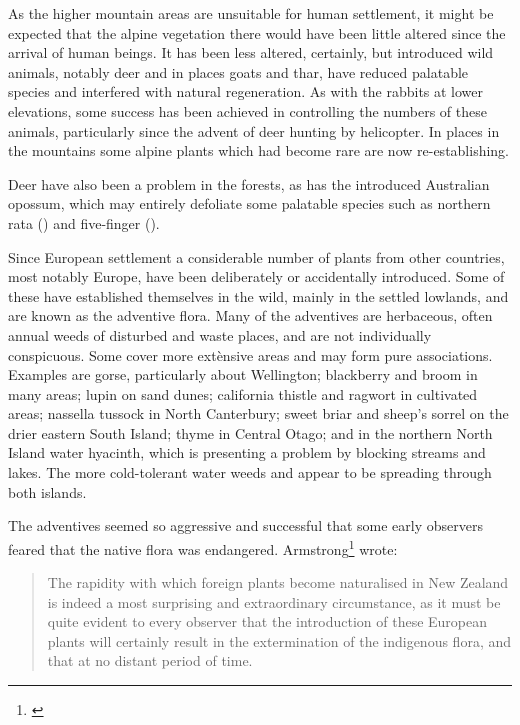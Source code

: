 As the higher mountain areas are unsuitable for human settlement, it might be expected that the alpine vegetation there would have been little altered since the arrival of human beings.
It has been less altered, certainly, but introduced wild animals, notably deer and in places goats and thar, have reduced palatable species and interfered with natural regeneration.
As with the rabbits at lower elevations, some success has been achieved in controlling the numbers of these animals, particularly since the advent of deer hunting by helicopter.
In places in the mountains some alpine plants which had become rare are now re-establishing.

Deer have also been a problem in the forests, as has the introduced Australian opossum, which may entirely defoliate some palatable species such as northern rata () and five-finger ().

Since European settlement a considerable number of plants from other countries, most notably Europe, have been deliberately or accidentally introduced.
Some of these have established themselves in the wild, mainly in the settled lowlands, and are known as the adventive flora.
Many of the adventives are herbaceous, often annual weeds of disturbed and waste places, and are not individually conspicuous.
Some cover more extènsive areas and may form pure associations.
Examples are gorse, particularly about Wellington; blackberry and broom in many areas; lupin on sand dunes; california thistle and ragwort in cultivated areas; nassella tussock in North Canterbury; sweet briar and sheep's sorrel on the drier eastern South Island; thyme in Central Otago; and in the northern North Island water hyacinth, which is presenting a problem by blocking streams and lakes.
The more cold-tolerant water weeds  and  appear to be spreading through both islands.

The adventives seemed so aggressive and successful that some early observers feared that the native flora was endangered.
Armstrong\footnote{\cite{armstrong1872naturalised}} wrote:

\begin{quote}
	The rapidity with which foreign plants become naturalised in New Zealand is indeed a most surprising and extraordinary circumstance, as it must be quite evident to every observer that the introduction of these European plants will certainly result in the extermination of the indigenous flora, and that at no distant period of time.
\end{quote}

